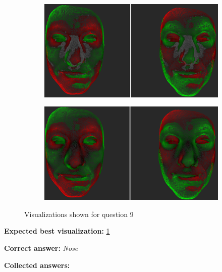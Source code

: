 \begin{figure}[h]
\begin{subfigure}{0.4\textwidth}
\includegraphics[width=\textwidth]{./screenshots/pair23.PNG}
\caption{}
\label{fig:study-8-23}
\end{subfigure}
\quad
\begin{subfigure}{0.4\textwidth}
\includegraphics[width=\textwidth]{./screenshots/pair20.PNG}
\caption{}
\label{fig:study-8-20}
\end{subfigure}
\caption{Visualizations shown for question 9}
\end{figure}
\medskip

{\bf Expected best visualization:} \ref{fig:study-8-23}
\medskip

{\bf Correct answer:} {\it Nose}
\medskip

{\bf Collected answers:}

